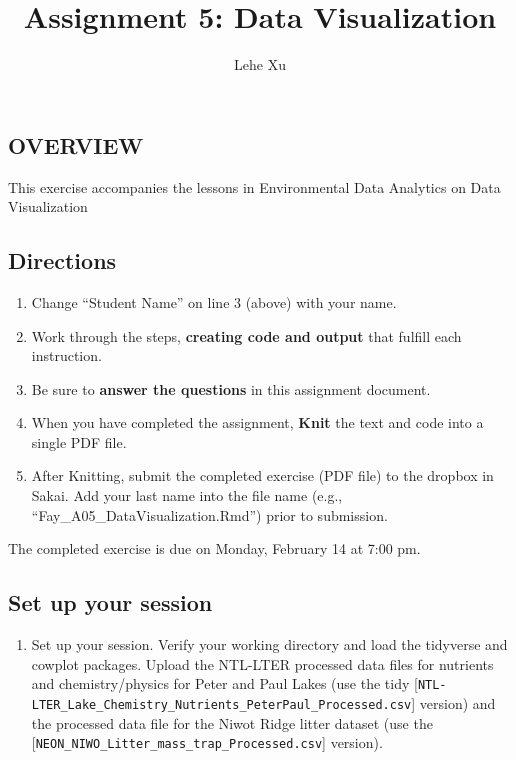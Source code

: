 \documentclass[]{article}
\title{Assignment 5: Data Visualization}
\author{Lehe Xu}
\date{}
\providecommand{\tightlist}{%
  \setlength{\itemsep}{0pt}\setlength{\parskip}{0pt}}
\begin{document}
\maketitle

\hypertarget{overview}{%
\subsection{OVERVIEW}\label{overview}}

This exercise accompanies the lessons in Environmental Data Analytics on
Data Visualization

\hypertarget{directions}{%
\subsection{Directions}\label{directions}}

\begin{enumerate}
\def\labelenumi{\arabic{enumi}.}
\tightlist
\item
  Change ``Student Name'' on line 3 (above) with your name.
\item
  Work through the steps, \textbf{creating code and output} that fulfill
  each instruction.
\item
  Be sure to \textbf{answer the questions} in this assignment document.
\item
  When you have completed the assignment, \textbf{Knit} the text and
  code into a single PDF file.
\item
  After Knitting, submit the completed exercise (PDF file) to the
  dropbox in Sakai. Add your last name into the file name (e.g.,
  ``Fay\_A05\_DataVisualization.Rmd'') prior to submission.
\end{enumerate}

The completed exercise is due on Monday, February 14 at 7:00 pm.

\hypertarget{set-up-your-session}{%
\subsection{Set up your session}\label{set-up-your-session}}

\begin{enumerate}
\def\labelenumi{\arabic{enumi}.}
\tightlist
\item
  Set up your session. Verify your working directory and load the
  tidyverse and cowplot packages. Upload the NTL-LTER processed data
  files for nutrients and chemistry/physics for Peter and Paul Lakes
  (use the tidy
  {[}\texttt{NTL-LTER\_Lake\_Chemistry\_Nutrients\_PeterPaul\_Processed.csv}{]}
  version) and the processed data file for the Niwot Ridge litter
  dataset (use the
  {[}\texttt{NEON\_NIWO\_Litter\_mass\_trap\_Processed.csv}{]} version).
\end{enumerate}
\end{document}
